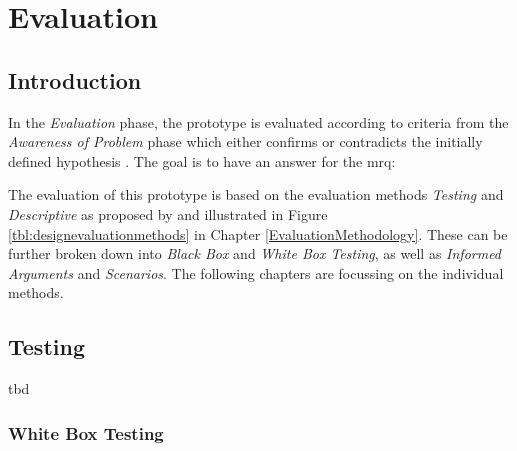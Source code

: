 
\chapter{Evaluation}

\label{ChapterEvaluation}


\section{Introduction}

In the \textit{Evaluation} phase, the prototype is evaluated according to criteria from the \textit{Awareness of Problem} phase which either confirms or contradicts the initially defined hypothesis \citep{Vaishnavi2008}. The goal is to have an answer for the \gls{mrq}:
\begin{framed}
	\textit{\mrqtext}
\end{framed}
The evaluation of this prototype is based on the evaluation methods \textit{Testing} and \textit{Descriptive} as proposed by \cite{Hevner2004} and illustrated in Figure \ref{tbl:designevaluationmethods} in Chapter \ref{EvaluationMethodology}. These can be further broken down into \textit{Black Box} and \textit{White Box Testing}, as well as \textit{Informed Arguments} and \textit{Scenarios}. The following chapters are focussing on the individual methods.



\section{Testing}

tbd


\subsection{White Box Testing}

